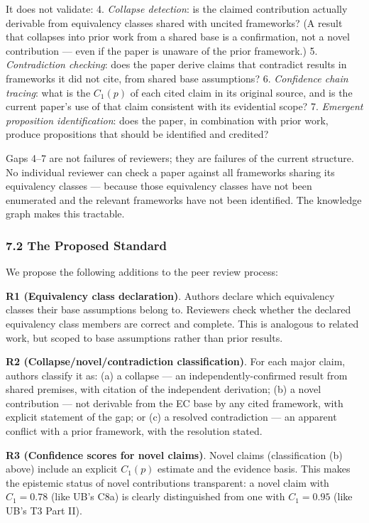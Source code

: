 \documentclass[
]{article}
\begin{document}
It does not validate: 4. \emph{Collapse detection}: is the claimed
contribution actually derivable from equivalency classes shared with
uncited frameworks? (A result that collapses into prior work from a
shared base is a confirmation, not a novel contribution --- even if the
paper is unaware of the prior framework.) 5. \emph{Contradiction
checking}: does the paper derive claims that contradict results in
frameworks it did not cite, from shared base assumptions? 6.
\emph{Confidence chain tracing}: what is the \(C_1(p)\) of each cited
claim in its original source, and is the current paper's use of that
claim consistent with its evidential scope? 7. \emph{Emergent
proposition identification}: does the paper, in combination with prior
work, produce propositions that should be identified and credited?

Gaps 4--7 are not failures of reviewers; they are failures of the
current structure. No individual reviewer can check a paper against all
frameworks sharing its equivalency classes --- because those equivalency
classes have not been enumerated and the relevant frameworks have not
been identified. The knowledge graph makes this tractable.

\subsubsection{7.2 The Proposed Standard}\label{the-proposed-standard}

We propose the following additions to the peer review process:

\textbf{R1 (Equivalency class declaration)}. Authors declare which
equivalency classes their base assumptions belong to. Reviewers check
whether the declared equivalency class members are correct and complete.
This is analogous to related work, but scoped to base assumptions rather
than prior results.

\textbf{R2 (Collapse/novel/contradiction classification)}. For each
major claim, authors classify it as: (a) a collapse --- an
independently-confirmed result from shared premises, with citation of
the independent derivation; (b) a novel contribution --- not derivable
from the EC base by any cited framework, with explicit statement of the
gap; or (c) a resolved contradiction --- an apparent conflict with a
prior framework, with the resolution stated.

\textbf{R3 (Confidence scores for novel claims)}. Novel claims
(classification (b) above) include an explicit \(C_1(p)\) estimate and
the evidence basis. This makes the epistemic status of novel
contributions transparent: a novel claim with \(C_1 = 0.78\) (like UB's
C8a) is clearly distinguished from one with \(C_1 = 0.95\) (like UB's T3
Part II).
\end{document}
